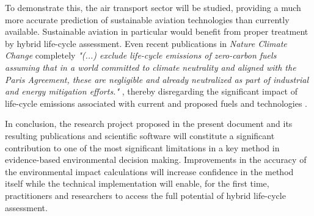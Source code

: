 \documentclass{article}
\begin{document}
    To demonstrate this, the air transport sector will be studied, providing a much more accurate prediction of sustainable aviation technologies than currently available. Sustainable aviation in particular would benefit from proper treatment by hybrid life-cycle assessment. Even recent publications in \textit{Nature Climate Change} completely \textit{"(...) exclude life-cycle emissions of zero-carbon fuels assuming that in a world committed to climate neutrality and aligned with the Paris Agreement, these are negligible and already neutralized as part of industrial and energy mitigation efforts."} \cite{brazzola_definitions_2022}, thereby disregarding the significant impact of life-cycle emissions associated with current and proposed fuels and technologies \cite{prussi_corsia_2021}.
    
    In conclusion, the research project proposed in the present document and its resulting publications and scientific software will constitute a significant contribution to one of the most significant limitations in a key method in evidence-based environmental decision making. Improvements in the accuracy of the environmental impact calculations will increase confidence in the method itself while the technical implementation will enable, for the first time, practitioners and researchers to access the full potential of hybrid life-cycle assessment.

    
    
    
\end{document}
